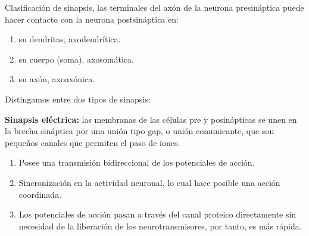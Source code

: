 Clasificación de sinapsis, las terminales del axón de la neurona presináptica puede hacer contacto con la neurona postsináptica en:
\begin{enumerate}
 \item su dendritas, axodendrítica.
 \item su cuerpo (soma), axosomática. 
 \item su axón, axoaxónica.
\end{enumerate}


Distingamos entre dos tipos de sinapsis:


 \textbf{Sinapsis eléctrica:} las membranas de las células pre y posinápticas se unen en la brecha sináptica por una unión tipo gap, o unión comunicante, que son pequeños canales que permiten el paso de iones.


	\begin{enumerate}
  	 \item Posee una transmisión bidireccional de los potenciales de acción.
  	 \item Sincronización en la actividad neuronal, lo cual hace posible una acción coordinada.
 	 \item Los potenciales de acción pasan a través del canal proteico directamente sin necesidad de la liberación de los neurotransmisores, por tanto, es más rápida.
	\end{enumerate}


